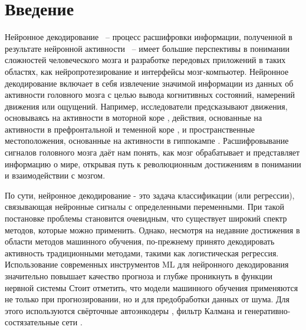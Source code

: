 \documentclass[a4paper, 12pt]{article}
\begin{document}
	\newpage
	
	\section*{Введение}
	
	Нейронное декодирование ~-- процесс расшифровки информации, полученной в результате нейронной активности ~-- имеет большие перспективы в понимании сложностей человеческого мозга и разработке передовых приложений в таких областях, как нейропротезирование и интерфейсы мозг-компьютер.
	Нейронное декодирование включает в себя извлечение значимой информации из данных об активности головного мозга с целью вывода когнитивных состояний, намерений движения или ощущений.
	Например, исследователи предсказывают движения, основываясь на активности в моторной коре \citep{temp_ethier2012restoration}, действия, основанные на активности в префронтальной и теменной коре \citep{temp_ibos2017sequential}, и пространственные местоположения, основанные на активности в гиппокампе \citep{temp_davidson2009hippocampal}. 
	Расшифровывание сигналов головного мозга даёт нам понять, как мозг обрабатывает и представляет информацию о мире, открывая путь к революционным достижениям в понимании и взаимодействии с мозгом.

	По сути, нейронное декодирование - это задача классификации (или регрессии), связывающая нейронные сигналы с определенными переменными. При такой постановке проблемы становится очевидным, что существует широкий спектр методов, которые можно
	применить. Однако, несмотря на недавние достижения в области методов машинного
	обучения, по-прежнему принято декодировать активность традиционными методами, такими как логистическая регрессия. Использование современных инструментов ML для нейронного декодирования значительно повышает качество прогноза и глубже проникнуть в функции нервной системы
	Стоит отметить, что модели машинного обучения применяются не только при прогнозировании, но и для предобработки данных от шума.
	Для этого используются свёрточные автоэнкодеры \citep{temp_leite2018deep, temp_caldas2020towards}, фильтр Калмана \citep{paninski2010new} и генеративно-состязательные сети \citep{temp_an2022auto}.
	
\end{document}
